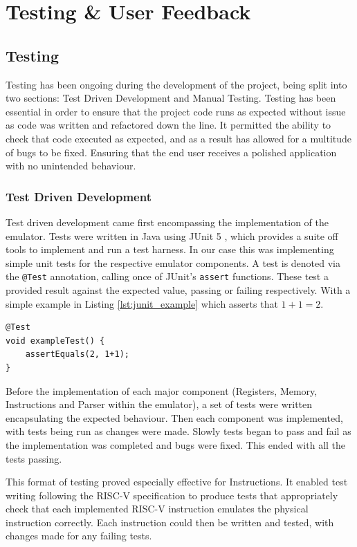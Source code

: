 \chapter{Testing \& User Feedback}
\label{ch:testing}
\section{Testing}
Testing has been ongoing during the development of the project, being split into two sections: Test Driven Development and Manual Testing. Testing has been essential in order to ensure that the project code runs as expected without issue as code was written and refactored down the line. It permitted the ability to check that code executed as expected, and as a result has allowed for a multitude of bugs to be fixed. Ensuring that the end user receives a polished application with no unintended behaviour.

\subsection{Test Driven Development}
Test driven development came first encompassing the implementation of the emulator. Tests were written in Java \cite{sunmicrosystems_2022_java} using JUnit 5 \cite{junitteam_2019_junit}, which provides a suite off tools to implement and run a test harness. In our case this was implementing simple unit tests for the respective emulator components. A test is denoted via the \verb|@Test| annotation, calling once of JUnit's \verb|assert| functions. These test a provided result against the expected value, passing or failing respectively. With a simple example in Listing \ref{lst:junit_example} which asserts that $1+1=2$.

\begin{lstlisting}[caption=JUnit test example, label=lst:junit_example]
@Test
void exampleTest() {
    assertEquals(2, 1+1);
}
\end{lstlisting}

Before the implementation of each major component (Registers, Memory, Instructions and Parser within the emulator), a set of tests were written encapsulating the expected behaviour. Then each component was implemented, with tests being run as changes were made. Slowly tests began to pass and fail as the implementation was completed and bugs were fixed. This ended with all the tests passing.

This format of testing proved especially effective for Instructions. It enabled test writing following the RISC-V specification \cite{riscv_2015_riscv} to produce tests that appropriately check that each implemented RISC-V instruction emulates the physical instruction correctly. Each instruction could then be written and tested, with changes made for any failing tests.

